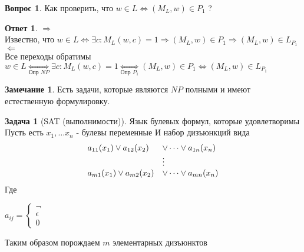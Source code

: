 \documentclass{beamer}
\theoremstyle{plain}
\theoremstyle{definition}
\newtheorem{Q}[thm]{Вопрос}
\newtheorem{prob-rus}[thm]{Задача}
\newtheorem{A}[thm]{Ответ}
\newtheorem{rmk}[thm]{Замечание}
\begin{document}
\begin{frame}
	\begin{Q}
	    Как проверить, что $w \in L \Leftrightarrow (M_L,w) \in P_1$ ?	
	\end{Q}
	\begin{A}
	    $\Rightarrow$ \\
	    Известно, что $w \in L \Leftrightarrow \exists c: M_L(w,c)=1 \Rightarrow (M_L,w) \in P_1 \Rightarrow (M_L,w) \in L_{P_1}$\\
	    $\Leftarrow$ \\
	    Все переходы обратимы \\
	    $w \in L {\underset{\mbox{Опр $NP$}}\Leftrightarrow} \exists c: M_L(w,c)=1 {\underset{\mbox{Опр $P_1$}}\Leftrightarrow} (M_L,w) \in P_1 \Leftrightarrow (M_L,w) \in L_{P_1}$
	\end{A}
\end{frame}

\begin{frame}
	\begin{rmk}
	    Есть задачи, которые являются $NP$ полными и имеют естественную формулировку. 	
	\end{rmk}
\end{frame}

\begin{frame}
	\begin{prob-rus}[SAT (выполнимости)]
	    Язык булевых формул, которые удовлетворимы \linebreak
	    Пусть есть $x_1, \dots x_n$ - булевы переменные \linebreak
	    И набор дизъюнкций вида \linebreak
		$$
	    \begin{array}{l l}
	        	a_{11}(x_1) \vee a_{12}(x_2) & \vee \dots \vee a_{1n}(x_n) \\
	    	    &\vdots \\
	    	    a_{m1}(x_1) \vee a_{m2}(x_2) & \vee \dots \vee a_{mn}(x_n)
	    \end{array} 
		$$
	    Где 

	    \begin{center}
	    	$a_{ij} = \begin{cases} \neg & \\ \epsilon & \\ 0 & \end{cases}$
	    \end{center} 

	    Таким образом порождаем $m$ элементарных дизъюнктов
	\end{prob-rus}
\end{frame}
\end{document}
